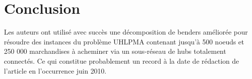\section{Conclusion}

Les auteurs ont utilisé avec succès une décomposition de benders améliorée pour résoudre des instances du problème UHLPMA contenant jusqu'à 500 noeuds et 250 000 marchandises à acheminer via un sous-réseau de hubs totalement connectés. Ce qui constitue probablement un record à la date de rédaction de l'article en l'occurrence juin 2010.
